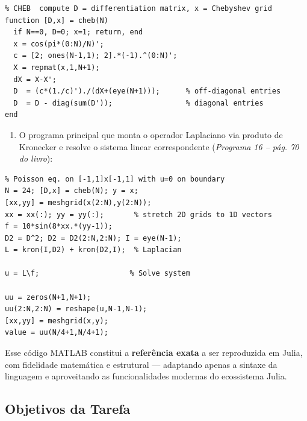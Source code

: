 \documentclass[12pt,a4paper]{article}
\begin{document}
\begin{verbatim}
% CHEB  compute D = differentiation matrix, x = Chebyshev grid
function [D,x] = cheb(N)
  if N==0, D=0; x=1; return, end
  x = cos(pi*(0:N)/N)'; 
  c = [2; ones(N-1,1); 2].*(-1).^(0:N)';
  X = repmat(x,1,N+1);
  dX = X-X';                  
  D  = (c*(1./c)')./(dX+(eye(N+1)));      % off-diagonal entries
  D  = D - diag(sum(D'));                 % diagonal entries
end
\end{verbatim}

\begin{enumerate}
    \item[2.] O programa principal que monta o operador Laplaciano via produto de Kronecker e resolve o sistema linear correspondente (\emph{Programa 16 – pág. 70 do livro}):
\end{enumerate}

\begin{verbatim}
% Poisson eq. on [-1,1]x[-1,1] with u=0 on boundary
N = 24; [D,x] = cheb(N); y = x;
[xx,yy] = meshgrid(x(2:N),y(2:N));
xx = xx(:); yy = yy(:);       % stretch 2D grids to 1D vectors
f = 10*sin(8*xx.*(yy-1));
D2 = D^2; D2 = D2(2:N,2:N); I = eye(N-1);
L = kron(I,D2) + kron(D2,I);  % Laplacian

u = L\f;                     % Solve system

uu = zeros(N+1,N+1);
uu(2:N,2:N) = reshape(u,N-1,N-1);
[xx,yy] = meshgrid(x,y);
value = uu(N/4+1,N/4+1);
\end{verbatim}

Esse código MATLAB constitui a \textbf{referência exata} a ser reproduzida em Julia, com fidelidade matemática e estrutural — adaptando apenas a sintaxe da linguagem e aproveitando as funcionalidades modernas do ecossistema Julia.

\subsection{Objetivos da Tarefa}
\end{document}
